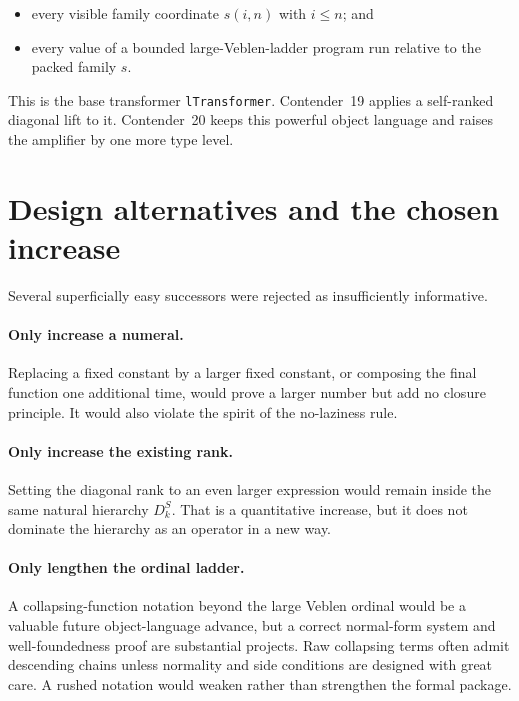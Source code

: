 \documentclass[11pt]{article}
\theoremstyle{definition}
\theoremstyle{remark}
\newcommand{\leanname}[1]{\nolinkurl{#1}}
\begin{document}
\begin{itemize}[leftmargin=*]
\item every visible family coordinate $s(i,n)$ with $i\le n$; and
\item every value of a bounded large-Veblen-ladder program run relative to the
  packed family $s$.
\end{itemize}

This is the base transformer \leanname{lTransformer}.  Contender~19 applies a
self-ranked diagonal lift to it.  Contender~20 keeps this powerful object
language and raises the amplifier by one more type level.

\section{Design alternatives and the chosen increase}

Several superficially easy successors were rejected as insufficiently
informative.

\paragraph{Only increase a numeral.}
Replacing a fixed constant by a larger fixed constant, or composing the final
function one additional time, would prove a larger number but add no closure
principle.  It would also violate the spirit of the no-laziness rule.

\paragraph{Only increase the existing rank.}
Setting the diagonal rank to an even larger expression would remain inside the
same natural hierarchy $D^S_k$.  That is a quantitative increase, but it does
not dominate the hierarchy as an operator in a new way.

\paragraph{Only lengthen the ordinal ladder.}
A collapsing-function notation beyond the large Veblen ordinal would be a
valuable future object-language advance, but a correct normal-form system and
well-foundedness proof are substantial projects.  Raw collapsing terms often
admit descending chains unless normality and side conditions are designed with
great care.  A rushed notation would weaken rather than strengthen the formal
package.
\end{document}
